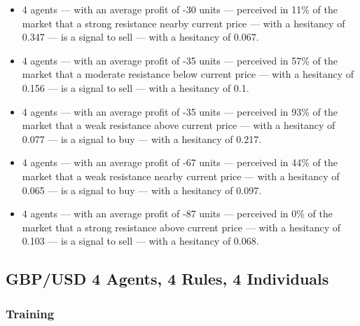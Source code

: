 {\small
  \begin{itemize}
  \item 4 agents — with an average profit of -30 units — perceived in 11\% of
    the market that a strong resistance nearby current price — with a
    hesitancy of 0.347 — is a signal to sell — with a hesitancy of 0.067.
  \item 4 agents — with an average profit of -35 units — perceived in 57\% of the
    market that a moderate resistance below current price — with a hesitancy of
    0.156 — is a signal to sell — with a hesitancy of 0.1.
  \item 4 agents — with an average profit of -35 units — perceived in 93\% of the
    market that a weak resistance above current price — with a hesitancy of 0.077
    — is a signal to buy — with a hesitancy of 0.217.
  \item 4 agents — with an average profit of -67 units — perceived in 44\% of the
    market that a weak resistance nearby current price — with a hesitancy of 0.065
    — is a signal to buy — with a hesitancy of 0.097.
  \item 4 agents — with an average profit of -87 units — perceived in 0\% of the
    market that a strong resistance above current price — with a hesitancy of
    0.103 — is a signal to sell — with a hesitancy of 0.068.
  \end{itemize}
}





\subsection{GBP/USD 4 Agents, 4 Rules, 4 Individuals}
\label{}

\subsubsection{Training}
\label{}

